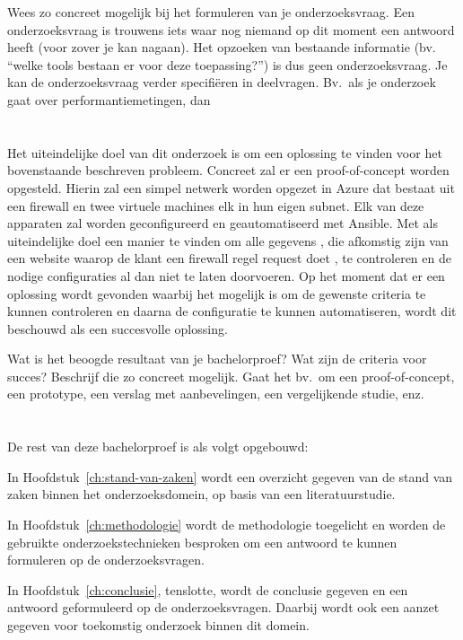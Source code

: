 Wees zo concreet mogelijk bij het formuleren van je onderzoeksvraag. Een onderzoeksvraag is trouwens iets waar nog niemand op dit moment een antwoord heeft (voor zover je kan nagaan). Het opzoeken van bestaande informatie (bv. ``welke tools bestaan er voor deze toepassing?'') is dus geen onderzoeksvraag. Je kan de onderzoeksvraag verder specifiëren in deelvragen. Bv.~als je onderzoek gaat over performantiemetingen, dan 

\section{}%
\label{sec:onderzoeksdoelstelling}
Het uiteindelijke doel van dit onderzoek is om een oplossing te vinden voor het bovenstaande beschreven probleem. Concreet zal er een proof-of-concept worden opgesteld. Hierin zal een simpel netwerk worden opgezet in Azure dat bestaat uit een firewall en twee virtuele machines elk in hun eigen subnet. Elk van deze apparaten zal worden geconfigureerd en geautomatiseerd met Ansible. Met als uiteindelijke doel een manier te vinden om alle gegevens , die afkomstig zijn van een website waarop de klant een firewall regel request doet , te controleren en de nodige configuraties al dan niet te laten doorvoeren. Op het moment dat er een oplossing wordt gevonden waarbij het mogelijk is om de gewenste criteria te kunnen controleren en daarna de configuratie te kunnen automatiseren, wordt dit beschouwd als een succesvolle oplossing. 

Wat is het beoogde resultaat van je bachelorproef? Wat zijn de criteria voor succes? Beschrijf die zo concreet mogelijk. Gaat het bv.\ om een proof-of-concept, een prototype, een verslag met aanbevelingen, een vergelijkende studie, enz.

\section{}%
\label{sec:opzet-bachelorproef-TODO}


De rest van deze bachelorproef is als volgt opgebouwd:

In Hoofdstuk~\ref{ch:stand-van-zaken} wordt een overzicht gegeven van de stand van zaken binnen het onderzoeksdomein, op basis van een literatuurstudie.

In Hoofdstuk~\ref{ch:methodologie} wordt de methodologie toegelicht en worden de gebruikte onderzoekstechnieken besproken om een antwoord te kunnen formuleren op de onderzoeksvragen.


In Hoofdstuk~\ref{ch:conclusie}, tenslotte, wordt de conclusie gegeven en een antwoord geformuleerd op de onderzoeksvragen. Daarbij wordt ook een aanzet gegeven voor toekomstig onderzoek binnen dit domein.